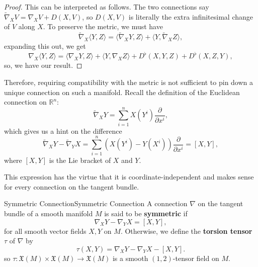 \documentclass[../main.tex]{subfiles}
\begin{document}
\begin{proof}
	This can be interpreted as follows. The two connections say $\tilde{\nabla}_X V = \nabla_X V + D(X, V)$, so $D(X, V)$ is literally the extra infinitesimal change of $V$ along $X$. To preserve the metric, we must have
	\begin{equation*}
		\tilde{\nabla}_X \langle Y, Z \rangle = \langle \tilde{\nabla}_X Y, Z \rangle + \langle Y, \tilde{\nabla}_X Z \rangle,
	\end{equation*}
	expanding this out, we get
	\begin{equation*}
		\nabla_X \langle Y, Z \rangle = \langle \nabla_X Y, Z \rangle + \langle Y, \nabla_X Z \rangle + D^{\flat}(X, Y, Z) + D^{\flat}(X, Z, Y),
	\end{equation*}
	so, we have our result.
\end{proof}

Therefore, requiring compatibility with the metric is not sufficient to pin down a unique connection on such a manifold. Recall the definition of the Euclidean connection on $\mathbb{R}^n$:
\begin{equation*}
	\tilde{\nabla}_X Y = \sum_{i=1}^n X(Y^i) \frac{\partial}{\partial x^i},
\end{equation*}
which gives us a hint on the difference
\begin{equation}
	\tilde{\nabla}_X Y - \tilde{\nabla}_Y X = \sum_{i=1}^n (X(Y^i) - Y(X^i)) \frac{\partial}{\partial x^i} = [X, Y],
\end{equation}
where $[X, Y]$ is the Lie bracket of $X$ and $Y$.

This expression has the virtue that it is coordinate-independent and makes sense for every connection on the tangent bundle.
\begin{definition}{Symmetric Connection}{Symmetric Connection}
	A connection $\nabla$ on the tangent bundle of a smooth manifold $M$ is said to be \textbf{symmetric} if
	\begin{equation}
		\nabla_X Y - \nabla_Y X = [X, Y],
	\end{equation}
	for all smooth vector fields $X, Y$ on $M$. Otherwise, we define the \textbf{torsion tensor} $\tau$ of $\nabla$ by
	\begin{equation}
		\tau(X, Y) = \nabla_X Y - \nabla_Y X - [X, Y].
	\end{equation}
	so $\tau: \mathfrak{X}(M) \times \mathfrak{X}(M) \to \mathfrak{X}(M)$ is a smooth $(1,2)$-tensor field on $M$.
\end{definition}
\end{document}
